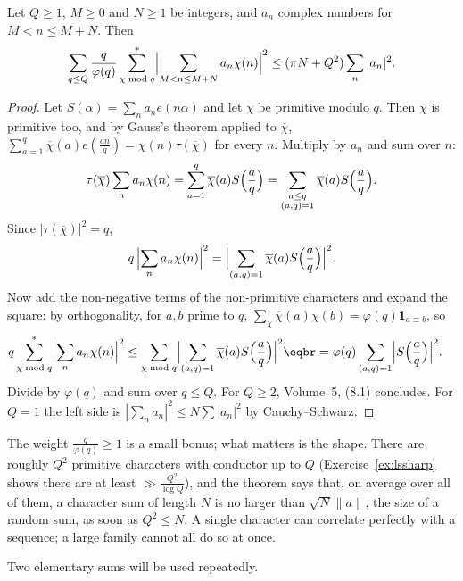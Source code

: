 \begin{theorem}\label{thm:lschar}
Let $Q\ge1$, $M\ge0$ and $N\ge1$ be integers, and $a_n$ complex numbers for $M<n\le M+N$. Then
\[
\sum_{q\le Q}\frac q{\varphi(q)}\sum^*_{\chi\bmod q}\Bigl|\sum_{M<n\le M+N}a_n\chi(n)\Bigr|^2\le(\pi N+Q^2)\sum_n|a_n|^2.
\]
\end{theorem}
\begin{proof}
Let $S(\alpha)=\sum_na_ne(n\alpha)$ and let $\chi$ be primitive modulo $q$. Then $\overline\chi$ is primitive too, and by Gauss's theorem applied to $\overline\chi$, $\sum_{a=1}^q\overline\chi(a)e(\frac{an}q)=\chi(n)\tau(\overline\chi)$ for every $n$. Multiply by $a_n$ and sum over $n$:
\[
\tau(\overline\chi)\sum_na_n\chi(n)=\sum_{a=1}^q\overline\chi(a)S\Bigl(\frac aq\Bigr)=\sum_{\substack{a\le q\\(a,q)=1}}\overline\chi(a)S\Bigl(\frac aq\Bigr).
\]
Since $|\tau(\overline\chi)|^2=q$,
\[
q\,\Bigl|\sum_na_n\chi(n)\Bigr|^2=\Bigl|\sum_{(a,q)=1}\overline\chi(a)S\Bigl(\frac aq\Bigr)\Bigr|^2.
\]
Now add the non-negative terms of the non-primitive characters and expand the square: by orthogonality, for $a,b$ prime to $q$, $\sum_\chi\overline\chi(a)\chi(b)=\varphi(q)\mathbf 1_{a\equiv b}$, so
\[
\begin{aligned}q\sum^*_{\chi\bmod q}\Bigl|\sum_na_n\chi(n)\Bigr|^2&\le\sum_{\chi\bmod q}\Bigl|\sum_{(a,q)=1}\overline\chi(a)S\Bigl(\frac aq\Bigr)\Bigr|^2\eqbr=\varphi(q)\sum_{(a,q)=1}\Bigl|S\Bigl(\frac aq\Bigr)\Bigr|^2.\end{aligned}
\]
Divide by $\varphi(q)$ and sum over $q\le Q$. For $Q\ge2$, Volume~5, (8.1) concludes. For $Q=1$ the left side is $|\sum_na_n|^2\le N\sum|a_n|^2$ by Cauchy--Schwarz.
\end{proof}

The weight $\frac q{\varphi(q)}\ge1$ is a small bonus; what matters is the shape. There are roughly $Q^2$ primitive characters with conductor up to $Q$ (Exercise~\ref{ex:lssharp} shows there are at least $\gg\frac{Q^2}{\log Q}$), and the theorem says that, on average over all of them, a character sum of length $N$ is no larger than $\sqrt N\|a\|$, the size of a random sum, as soon as $Q^2\le N$. A single character can correlate perfectly with a sequence; a large family cannot all do so at once.

Two elementary sums will be used repeatedly.

